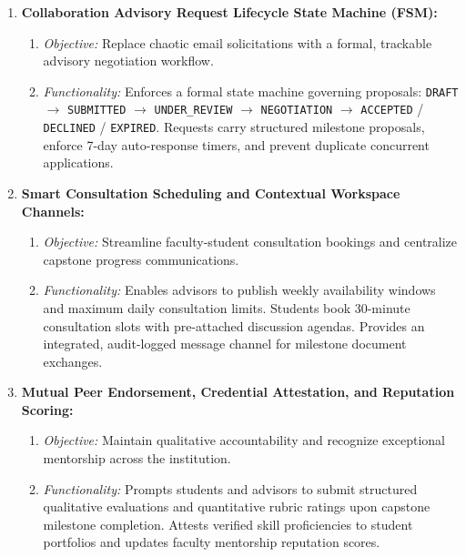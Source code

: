 \begin{enumerate}[label=\textbf{\arabic*.}]
    \item \textbf{Collaboration Advisory Request Lifecycle State Machine (FSM):}
    \begin{enumerate}[label=(\alph*)]
        \item \textit{Objective:} Replace chaotic email solicitations with a formal, trackable advisory negotiation workflow.
        \item \textit{Functionality:} Enforces a formal state machine governing proposals: \texttt{DRAFT} $\rightarrow$ \texttt{SUBMITTED} $\rightarrow$ \texttt{UNDER\_REVIEW} $\rightarrow$ \texttt{NEGOTIATION} $\rightarrow$ \texttt{ACCEPTED} / \texttt{DECLINED} / \texttt{EXPIRED}. Requests carry structured milestone proposals, enforce 7-day auto-response timers, and prevent duplicate concurrent applications.
    \end{enumerate}

    \item \textbf{Smart Consultation Scheduling and Contextual Workspace Channels:}
    \begin{enumerate}[label=(\alph*)]
        \item \textit{Objective:} Streamline faculty-student consultation bookings and centralize capstone progress communications.
        \item \textit{Functionality:} Enables advisors to publish weekly availability windows and maximum daily consultation limits. Students book 30-minute consultation slots with pre-attached discussion agendas. Provides an integrated, audit-logged message channel for milestone document exchanges.
    \end{enumerate}

    \item \textbf{Mutual Peer Endorsement, Credential Attestation, and Reputation Scoring:}
    \begin{enumerate}[label=(\alph*)]
        \item \textit{Objective:} Maintain qualitative accountability and recognize exceptional mentorship across the institution.
        \item \textit{Functionality:} Prompts students and advisors to submit structured qualitative evaluations and quantitative rubric ratings upon capstone milestone completion. Attests verified skill proficiencies to student portfolios and updates faculty mentorship reputation scores.
    \end{enumerate}


\end{enumerate}
